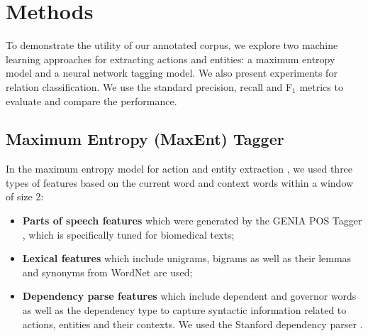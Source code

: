 \documentclass[11pt,a4paper]{article}
\begin{document}
\section{Methods}
To demonstrate the utility of our annotated corpus, we explore two machine learning approaches for extracting actions and entities: a maximum entropy model and a neural network tagging model. We also present experiments for relation classification. We use the standard precision, recall and F$_1$ metrics to evaluate and compare the performance. 


\subsection{Maximum Entropy (MaxEnt) Tagger}
In the maximum entropy model for action and entity extraction \cite{borthwick1999maximum}, we used three types of features based on the current word and context words within a window of size 2: %
\begin{itemize}
    \vspace{-.1in}
    \item \textbf{Parts of speech features} which were generated by the GENIA POS Tagger \cite{tsuruoka2005bidirectional}, which is specifically tuned for biomedical texts;
    \vspace{-.1in}
    \item \textbf{Lexical features} which include unigrams, bigrams as well as their lemmas and synonyms from WordNet \cite{miller1995wordnet} are used;
    \vspace{-.1in}
    \item \textbf{Dependency parse features} which include dependent and governor words as well as the dependency type to capture syntactic information related to actions, entities and their contexts. We used the Stanford dependency parser \cite{chen2014fast}. 
\end{itemize}
\end{document}
